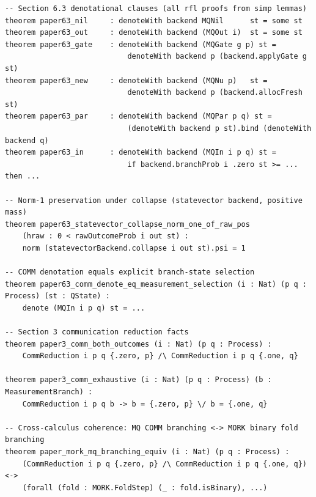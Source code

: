 \documentclass[11pt]{article}
\begin{document}
\begin{lstlisting}[language={},caption={Stable paper-to-theorem index (\texttt{PaperMap.lean})}]
-- Section 6.3 denotational clauses (all rfl proofs from simp lemmas)
theorem paper63_nil     : denoteWith backend MQNil      st = some st
theorem paper63_out     : denoteWith backend (MQOut i)  st = some st
theorem paper63_gate    : denoteWith backend (MQGate g p) st =
                            denoteWith backend p (backend.applyGate g st)
theorem paper63_new     : denoteWith backend (MQNu p)   st =
                            denoteWith backend p (backend.allocFresh st)
theorem paper63_par     : denoteWith backend (MQPar p q) st =
                            (denoteWith backend p st).bind (denoteWith backend q)
theorem paper63_in      : denoteWith backend (MQIn i p q) st =
                            if backend.branchProb i .zero st >= ... then ...

-- Norm-1 preservation under collapse (statevector backend, positive mass)
theorem paper63_statevector_collapse_norm_one_of_raw_pos
    (hraw : 0 < rawOutcomeProb i out st) :
    norm (statevectorBackend.collapse i out st).psi = 1

-- COMM denotation equals explicit branch-state selection
theorem paper63_comm_denote_eq_measurement_selection (i : Nat) (p q : Process) (st : QState) :
    denote (MQIn i p q) st = ...

-- Section 3 communication reduction facts
theorem paper3_comm_both_outcomes (i : Nat) (p q : Process) :
    CommReduction i p q {.zero, p} /\ CommReduction i p q {.one, q}

theorem paper3_comm_exhaustive (i : Nat) (p q : Process) (b : MeasurementBranch) :
    CommReduction i p q b -> b = {.zero, p} \/ b = {.one, q}

-- Cross-calculus coherence: MQ COMM branching <-> MORK binary fold branching
theorem paper_mork_mq_branching_equiv (i : Nat) (p q : Process) :
    (CommReduction i p q {.zero, p} /\ CommReduction i p q {.one, q}) <->
    (forall (fold : MORK.FoldStep) (_ : fold.isBinary), ...)
\end{lstlisting}
\end{document}
